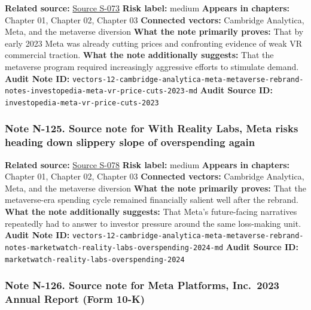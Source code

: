 \documentclass[
  american,
  11pt,
  letterpaper,
]{article}
\begin{document}
\textbf{Related source:}
\hyperref[source-s-073-meta-slashes-prices-for-vr-headsets]{Source
S-073} \textbf{Risk label:} medium \textbf{Appears in chapters:} Chapter
01, Chapter 02, Chapter 03 \textbf{Connected vectors:} Cambridge
Analytica, Meta, and the metaverse diversion \textbf{What the note
primarily proves:} That by early 2023 Meta was already cutting prices
and confronting evidence of weak VR commercial traction. \textbf{What
the note additionally suggests:} That the metaverse program required
increasingly aggressive efforts to stimulate demand. \textbf{Audit Note
ID:}
\texttt{vectors-12-cambridge-analytica-meta-metaverse-rebrand-notes-investopedia-meta-vr-price-cuts-2023-md}
\textbf{Audit Source ID:} \texttt{investopedia-meta-vr-price-cuts-2023}

\subsubsection{Note N-125. Source note for With Reality Labs, Meta risks
heading down slippery slope of overspending
again}\label{note-n-125-vectors-12-cambridge-analytica-meta-metaverse-rebrand-notes-marketwatch-reality-labs-overspending-2024-md}

\textbf{Related source:}
\hyperref[source-s-078-with-reality-labs-meta-risks-heading-down-slippery-slope-of-overspending-again]{Source
S-078} \textbf{Risk label:} medium \textbf{Appears in chapters:} Chapter
01, Chapter 02, Chapter 03 \textbf{Connected vectors:} Cambridge
Analytica, Meta, and the metaverse diversion \textbf{What the note
primarily proves:} That the metaverse-era spending cycle remained
financially salient well after the rebrand. \textbf{What the note
additionally suggests:} That Meta's future-facing narratives repeatedly
had to answer to investor pressure around the same loss-making unit.
\textbf{Audit Note ID:}
\texttt{vectors-12-cambridge-analytica-meta-metaverse-rebrand-notes-marketwatch-reality-labs-overspending-2024-md}
\textbf{Audit Source ID:}
\texttt{marketwatch-reality-labs-overspending-2024}

\subsubsection{Note N-126. Source note for Meta Platforms, Inc.~2023
Annual Report (Form
10-K)}\label{note-n-126-vectors-12-cambridge-analytica-meta-metaverse-rebrand-notes-meta-2023-10k-md}
\end{document}
